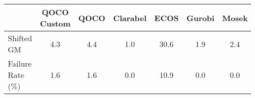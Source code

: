\begin{tabular}{lcccccc}
  \hline
    & \textbf{QOCO Custom}   & \textbf{QOCO} & \textbf{Clarabel} & \textbf{ECOS} & \textbf{Gurobi} & \textbf{Mosek} \\ \hline
  Shifted GM & 4.3 & 4.4 & 1.0 & 30.6 & 1.9 & 2.4 \\ 
  Failure Rate (\%) & 1.6 & 1.6 & 0.0 & 10.9 & 0.0 & 0.0 \\ \hline 
\end{tabular}
